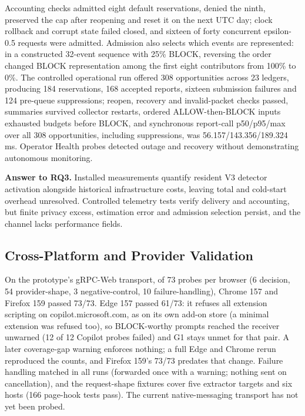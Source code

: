 \documentclass[sigconf]{acmart}
\theoremstyle{acmdefinition}\newtheorem{property}{Property}
\newcommand{\pendingStageThirteen}[1]{#1}
\begin{document}
Accounting checks admitted eight default reservations, denied the ninth, preserved the cap after reopening and reset it on the next UTC day; clock rollback and corrupt state failed closed, and sixteen of forty concurrent epsilon-0.5 requests were admitted. Admission also selects which events are represented: in a constructed 32-event sequence with 25\% BLOCK, reversing the order changed BLOCK representation among the first eight contributors from 100\% to 0\%. The controlled operational run offered 308 opportunities across 23 ledgers, producing 184 reservations, 168 accepted reports, sixteen submission failures and 124 pre-queue suppressions; reopen, recovery and invalid-packet checks passed, summaries survived collector restarts, ordered ALLOW-then-BLOCK inputs exhausted budgets before BLOCK, and synchronous report-call p50/p95/max over all 308 opportunities, including suppressions, was 56.157/143.356/189.324 ms. Operator Health probes detected outage and recovery without demonstrating autonomous monitoring.

\textbf{Answer to RQ3.} Installed measurements quantify resident V3 detector activation alongside historical infrastructure costs, leaving total and cold-start overhead unresolved. Controlled telemetry tests verify delivery and accounting, but finite privacy excess, estimation error and admission selection persist, and the channel lacks performance fields.

\subsection{Cross-Platform and Provider Validation}
\label{sec:cross_platform}
On the prototype's gRPC-Web transport, of 73 probes per browser (6 decision, 54 provider-shape, 3 negative-control, 10 failure-handling), Chrome 157 and Firefox 159 passed 73/73. Edge 157 passed 61/73: it refuses all extension scripting on copilot.microsoft.com, as on its own add-on store (a minimal extension was refused too), so BLOCK-worthy prompts reached the receiver unwarned (12 of 12 Copilot probes failed) and G1 stays unmet for that pair. A later coverage-gap warning enforces nothing; a full Edge and Chrome rerun reproduced the counts, and Firefox 159's 73/73 predates that change. Failure handling matched in all runs (forwarded once with a warning; nothing sent on cancellation), and the request-shape fixtures cover five extractor targets and six hosts (166 page-hook tests pass). \pendingStageThirteen{The current native-messaging transport has not yet been probed.}
\end{document}
